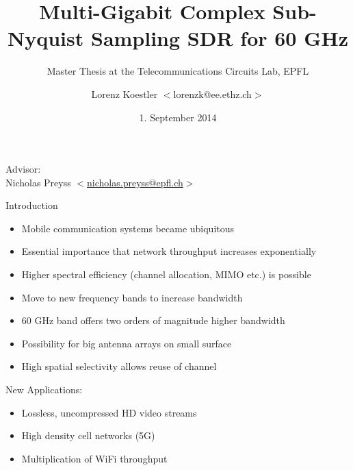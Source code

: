 \documentclass[10pt]{beamer}
\title{Multi-Gigabit Complex Sub-Nyquist Sampling SDR for 60 GHz}
\subtitle{Master Thesis at the Telecommunications Circuits Lab, EPFL}
\author{Lorenz Koestler $ < $lorenzk@ee.ethz.ch$ > $}
\date[1.9..2013]{1. September 2014}
\begin{document}
{
  \begin{frame}
    \titlepage

    {\color{white}
      Advisor: \\
      Nicholas Preyss $ < $\href{mailto:nicholas.preyss@epfl.ch}{nicholas.preyss@epfl.ch}$ > $ \\
    }
  \end{frame}
}

\begin{frame}{Introduction}
  \begin{itemize}
  \item Mobile communication systems became ubiquitous
  \item Essential importance that network throughput increases
    exponentially
  \item Higher spectral efficiency (channel allocation, MIMO etc.) is possible
  \item Move to new frequency bands to increase bandwidth
  \item 60 GHz band offers two orders of magnitude higher bandwidth
  \item Possibility for big antenna arrays on small surface
  \item High spatial selectivity allows reuse of channel
  \end{itemize}
  \begin{block}{New Applications:}
    \begin{itemize}
    \item Lossless, uncompressed HD video streams
    \item High density cell networks (5G)
    \item Multiplication of WiFi throughput
    \end{itemize}
  \end{block}
\end{frame}
\end{document}
